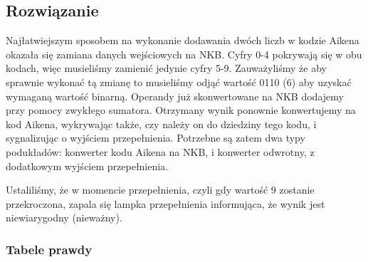 \documentclass[a4paper,12pt]{extarticle}  %
\begin{document}
\subsection{Rozwiązanie}
Najłatwiejszym sposobem na wykonanie dodawania dwóch liczb w kodzie Aikena okazała się zamiana danych wejściowych na NKB.
Cyfry 0-4 pokrywają się w obu kodach, więc musieliśmy zamienić jedynie cyfry 5-9.
Zauważyliśmy że aby sprawnie wykonać tą zmianę to musieliśmy odjąć wartość 0110 (6) aby uzyskać wymaganą wartość binarną.
Operandy już skonwertowane na NKB dodajemy przy pomocy zwykłego sumatora. Otrzymany wynik ponownie konwertujemy na kod Aikena, wykrywając także, czy należy on do dziedziny tego kodu, i sygnalizując o wyjściem przepełnienia.
Potrzebne są zatem dwa typy podukładów: konwerter kodu Aikena na NKB, i konwerter odwrotny, z dodatkowym wyjściem przepełnienia. 

Ustaliliśmy, że w momencie przepełnienia, czyli gdy wartość 9 zostanie przekroczona, zapala się lampka przepełnienia informująca, że wynik jest niewiarygodny (nieważny).


\subsubsection{Tabele prawdy} %
\end{document}
